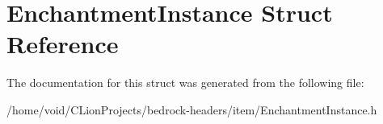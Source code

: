 \hypertarget{struct_enchantment_instance}{}\section{Enchantment\+Instance Struct Reference}
\label{struct_enchantment_instance}


The documentation for this struct was generated from the following file\+:\begin{DoxyCompactItemize}
\item 
/home/void/\+C\+Lion\+Projects/bedrock-\/headers/item/Enchantment\+Instance.\+h\end{DoxyCompactItemize}
